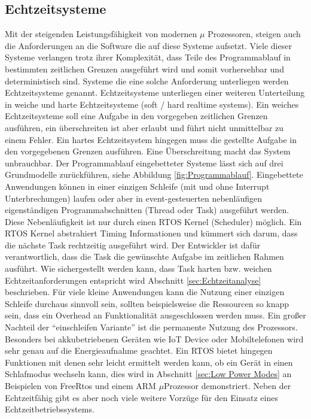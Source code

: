 \documentclass[ngerman]{seminarvorlage}
\begin{document}
\subsection{Echtzeitsysteme}
Mit der steigenden Leistungsfähigkeit von modernen $\mu$ Prozessoren, steigen auch die Anforderungen an die Software die auf diese Systeme aufsetzt. Viele dieser Systeme verlangen trotz ihrer Komplexität, dass Teile des Programmablauf in bestimmten zeitlichen Grenzen ausgeführt wird und somit vorhersehbar und deterministisch sind. Systeme die eine solche Anforderung unterliegen werden Echtzeitsysteme genannt. Echtzeitsysteme unterliegen einer weiteren Unterteilung in weiche und harte Echtzeitsysteme (soft / hard realtime systems). Ein weiches Echtzeitsysteme soll eine Aufgabe in den vorgegeben zeitlichen Grenzen ausführen, ein überschreiten ist aber erlaubt und führt nicht unmittelbar zu einem Fehler. Ein hartes Echtzeitsystem hingegen muss die gestellte Aufgabe in den vorgegebenen Grenzen ausführen. Eine Überschreitung macht das System unbrauchbar. Der Programmablauf eingebetteter Systeme lässt sich auf drei Grundmodelle zurückführen, siehe Abbildung \ref{fig:Programmablauf}. Eingebettete Anwendungen können in einer einzigen Schleife (mit und ohne Interrupt Unterbrechungen) laufen oder aber in event-gesteuerten nebenläufigen eigenständigen Programmabschnitten (Thread oder Task) ausgeführt werden. Diese Nebenläufigkeit ist nur durch einen RTOS Kernel (Scheduler) möglich. Ein RTOS Kernel abstrahiert Timing Informationen und kümmert sich darum, dass die nächste Task rechtzeitig ausgeführt wird. Der Entwickler ist dafür verantwortlich, dass die Task die gewünschte Aufgabe im zeitlichen Rahmen ausführt. Wie sichergestellt werden kann, dass Task  harten bzw. weichen Echtzeitanforderungen entspricht wird Abschnitt \ref{sec:Echtzeitanalyse} beschrieben. Für viele kleine Anwendungen kann die Nutzung einer einzigen Schleife durchaus sinnvoll sein, sollten beispielsweise die Ressourcen so knapp sein, dass ein Overhead an Funktionalität ausgeschlossen werden muss. Ein großer Nachteil der "`einschleifen Variante"' ist die permanente Nutzung des Prozessors. Besonders bei akkubetriebenen Geräten wie IoT Device oder Mobiltelefonen wird sehr genau auf die Energieaufnahme geachtet. Ein RTOS bietet hingegen Funktionen mit denen sehr leicht ermittelt werden kann, ob ein Gerät in einen Schlafmodus wechseln kann, dies wird in Abschnitt \ref{sec:Low Power Modes} an Beispielen von FreeRtos und einem ARM $\mu$Prozessor demonstriert. Neben der Echtzeitfähig gibt es aber noch viele weitere Vorzüge für den Einsatz eines Echtzeitbetriebssystems.  
\end{document}

